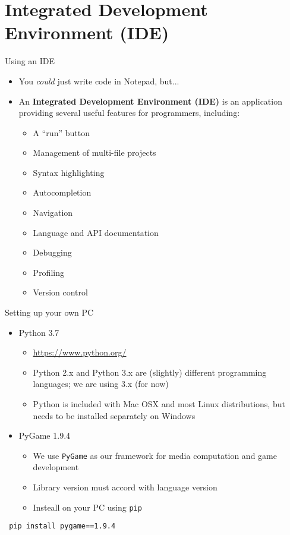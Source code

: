 \part{Integrated Development Environment (IDE)}
\frame{\partpage}

\begin{frame}{Using an IDE}
\begin{itemize}
	\item You \textit{could} just write code in Notepad, but...
	\item An \textbf{Integrated Development Environment (IDE)} is an application providing several
	useful features for programmers, including:
	\begin{itemize}
		\item A ``run'' button
		\item Management of multi-file projects
		\item Syntax highlighting
		\item Autocompletion
		\item Navigation
		\item Language and API documentation
		\item Debugging
		\item Profiling
		\item Version control
	\end{itemize}
\end{itemize}
\end{frame}

\begin{frame}[fragile]{Setting up your own PC}
\begin{itemize}
	\item Python 3.7
	\begin{itemize}
		\item \url{https://www.python.org/}
		\item Python 2.x and Python 3.x are (slightly) different programming languages; we are using 3.x (for now)
		\item Python is included with Mac OSX and most Linux distributions, but needs to be installed separately on Windows
	\end{itemize}

	\item PyGame 1.9.4
	\begin{itemize}
	\item We use \texttt{PyGame} as our framework for media computation and game development
	\item Library version must accord with language version
	\item Insteall on your PC using \texttt{pip}
	\end{itemize}
\end{itemize}

 \begin{lstlisting}
 pip install pygame==1.9.4
 \end{lstlisting}

\end{frame}

